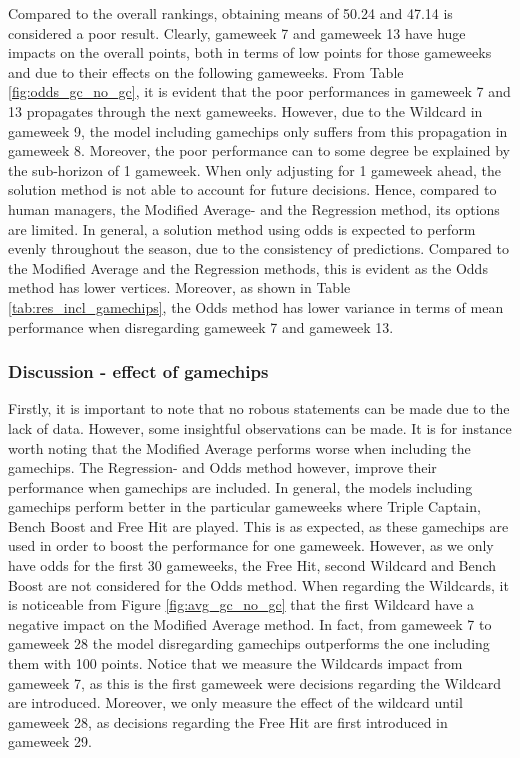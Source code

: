 Compared to the overall rankings, obtaining means of 50.24 and 47.14 is considered a poor result. Clearly, gameweek 7 and gameweek 13 have huge impacts on the overall points, both in terms of low points for those gameweeks and due to their effects on the following gameweeks. From Table \ref{fig:odds_gc_no_gc}, it is evident that the poor performances in gameweek 7 and 13 propagates through the next gameweeks. However, due to the Wildcard in gameweek 9, the model including gamechips only suffers from this propagation in gameweek 8. Moreover, the poor performance can to some degree be explained by the sub-horizon of 1 gameweek. When only adjusting for 1 gameweek ahead, the solution method is not able to account for future decisions. Hence, compared to human managers, the Modified Average- and the Regression method, its options are limited.  
\newpar
In general, a solution method using odds is expected to perform evenly throughout the season, due to the consistency of predictions. Compared to the Modified Average and the Regression methods, this is evident as the Odds method has lower vertices. Moreover, as shown in Table \ref{tab:res_incl_gamechips}, the Odds method has lower variance in terms of mean performance when disregarding gameweek 7 and gameweek 13.  



\subsubsection{Discussion - effect of gamechips}
Firstly, it is important to note that no robous statements can be made due to the lack of data. However, some insightful observations can be made. It is for instance worth noting that the Modified Average performs worse when including the gamechips. The Regression- and Odds method however, improve their performance when gamechips are included. 
\newpar
In general, the models including gamechips perform better in the particular gameweeks where Triple Captain, Bench Boost and Free Hit are played. This is as expected, as these gamechips are used in order to boost the performance for one gameweek. However, as we only have odds for the first 30 gameweeks, the Free Hit, second Wildcard and Bench Boost are not considered for the Odds method. 
\newpar
When regarding the Wildcards, it is noticeable from Figure \ref{fig:avg_gc_no_gc} that the first Wildcard have a negative impact on the Modified Average method. In fact, from gameweek 7 to gameweek 28 the model disregarding gamechips outperforms the one including them with 100 points. Notice that we measure the Wildcards impact from gameweek 7, as this is the first gameweek were decisions regarding the Wildcard are introduced. Moreover, we only measure the effect of the wildcard until gameweek 28, as decisions regarding the Free Hit are first introduced in gameweek 29. 

